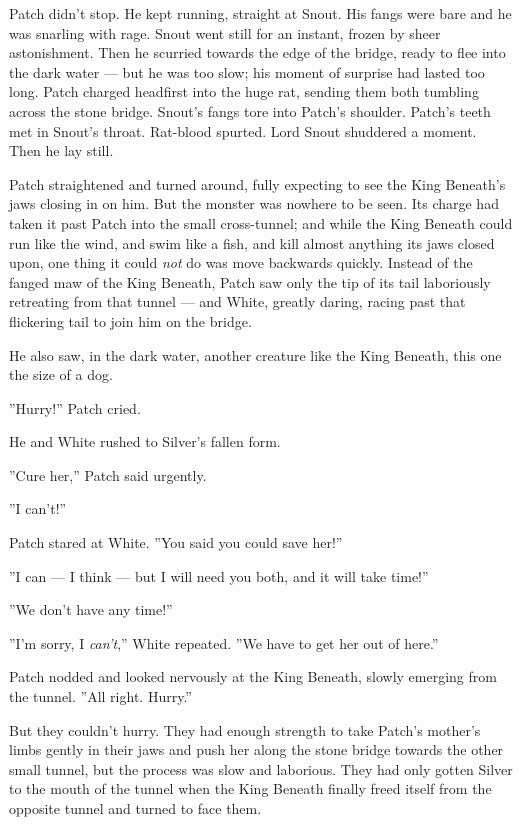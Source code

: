 \documentclass[12pt]{book}
\begin{document}
Patch didn't stop. He kept running, straight at Snout. His fangs were bare and he was snarling with rage. Snout went still for an instant, frozen by sheer astonishment. Then he scurried towards the edge of the bridge, ready to flee into the dark water ---
but he was too slow; his moment of surprise had lasted too long. Patch charged headfirst into the huge rat, sending them both tumbling across the stone bridge. Snout's fangs tore into Patch's shoulder. Patch's teeth met in Snout's throat. Rat-blood spurted. Lord Snout shuddered a moment. Then he lay still.

Patch straightened and turned around, fully expecting to see the King Beneath's jaws closing in on him. But the monster was nowhere to be seen. Its charge had taken it past Patch into the small cross-tunnel; and while the King Beneath could run like the wind, and swim like a fish, and kill almost anything its jaws closed upon, one thing it could {\it not} do was move backwards quickly. Instead of the fanged maw of the King Beneath, Patch saw only the tip of its tail laboriously retreating from that tunnel ---
and White, greatly daring, racing past that flickering tail to join him on the bridge.

He also saw, in the dark water, another creature like the King Beneath, this one the size of a dog.

''Hurry!'' Patch cried.

He and White rushed to Silver's fallen form.

''Cure her,'' Patch said urgently.

''I can't!''

Patch stared at White. ''You said you could save her!''

''I can ---
I think ---
but I will need you both, and it will take time!''

''We don't have any time!''

''I'm sorry, I {\it can't},'' White repeated. ''We have to get her out of here.''

Patch nodded and looked nervously at the King Beneath, slowly emerging from the tunnel. ''All right. Hurry.''

But they couldn't hurry. They had enough strength to take Patch's mother's limbs gently in their jaws and push her along the stone bridge towards the other small tunnel, but the process was slow and laborious. They had only gotten Silver to the mouth of the tunnel when the King Beneath finally freed itself from the opposite tunnel and turned to face them.
\end{document}
